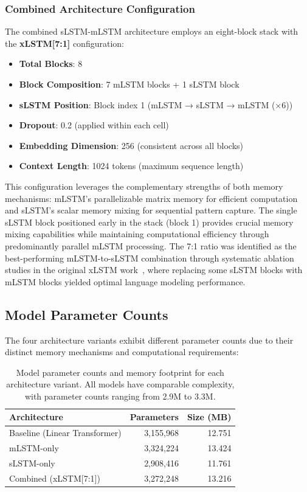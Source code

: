 \subsubsection{Combined Architecture Configuration}
\label{sec:combined_config}

The combined \ac{sLSTM}-\ac{mLSTM} architecture employs an eight-block stack with the \textbf{xLSTM[7:1]} configuration:

\begin{itemize}
    \item \textbf{Total Blocks}: 8
    \item \textbf{Block Composition}: 7 \ac{mLSTM} blocks + 1 \ac{sLSTM} block
    \item \textbf{sLSTM Position}: Block index 1 (\ac{mLSTM} → \ac{sLSTM} → \ac{mLSTM} (×6))
    \item \textbf{Dropout}: 0.2 (applied within each cell)
    \item \textbf{Embedding Dimension}: 256 (consistent across all blocks)
    \item \textbf{Context Length}: 1024 tokens (maximum sequence length)
\end{itemize}

This configuration leverages the complementary strengths of both memory mechanisms: \ac{mLSTM}'s parallelizable matrix memory for efficient computation and \ac{sLSTM}'s scalar memory mixing for sequential pattern capture. The single \ac{sLSTM} block positioned early in the stack (block 1) provides crucial memory mixing capabilities while maintaining computational efficiency through predominantly parallel \ac{mLSTM} processing. The 7:1 ratio was identified as the best-performing \ac{mLSTM}-to-\ac{sLSTM} combination through systematic ablation studies in the original xLSTM work~\cite{beck2024xlstm}, where replacing some \ac{sLSTM} blocks with \ac{mLSTM} blocks yielded optimal language modeling performance.

\subsection{Model Parameter Counts}
\label{sec:model_parameters}

The four architecture variants exhibit different parameter counts due to their distinct memory mechanisms and computational requirements:

\begin{table}[h]
\centering
\begin{tabular}{lrr}
\hline
\textbf{Architecture} & \textbf{Parameters} & \textbf{Size (MB)} \\
\hline
Baseline (Linear Transformer) & 3,155,968 & 12.751 \\
mLSTM-only & 3,324,224 & 13.424 \\
sLSTM-only & 2,908,416 & 11.761 \\
Combined (xLSTM[7:1]) & 3,272,248 & 13.216 \\
\hline
\end{tabular}
\caption{Model parameter counts and memory footprint for each architecture variant. All models have comparable complexity, with parameter counts ranging from 2.9M to 3.3M.}
\label{tab:model_parameters}
\end{table}

